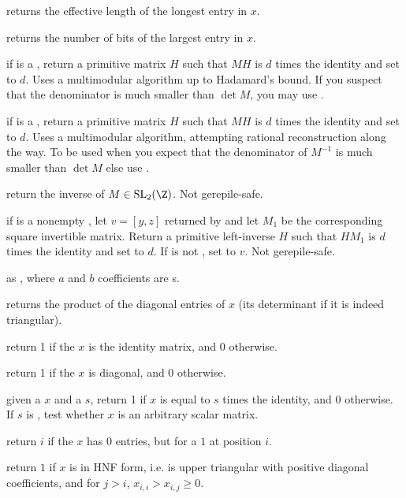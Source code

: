  returns the effective length of the longest
entry in $x$.

 returns the number of bits of the largest
entry in $x$.

 if  is a , return
a primitive matrix $H$ such that $M H$ is $d$ times the identity
and set  to $d$. Uses a multimodular algorithm up to Hadamard's bound.
If you suspect that the denominator is much smaller than $\det M$, you may
use .

 if  is a ,
return a primitive matrix $H$ such that $M H$ is $d$ times the identity
and set  to $d$. Uses a multimodular algorithm, attempting
rational reconstruction along the way. To be used when you expect that the
denominator of $M^{-1}$ is much smaller than $\det M$ else use .

 return the inverse of $M \in
\text{SL}_2(\Z)$. Not gerepile-safe.

 if  is a nonempty
, let $v = [y,z]$ returned by  and
let $M_1$ be the corresponding square invertible matrix.
Return a primitive left-inverse $H$ such that $H M_1$ is
$d$ times the identity and set  to $d$. If  is not
, set  to $v$. Not gerepile-safe.

 as , where $a$ and $b$
coefficients are s.

 returns the product of the diagonal
entries of $x$ (its determinant if it is indeed triangular).

 return 1 if the  $x$ is the
identity matrix, and 0 otherwise.

 return 1 if the  $x$ is diagonal,
and 0 otherwise.

 given a  $x$ and a
 $s$, return 1 if $x$ is equal to $s$ times the identity, and 0
otherwise. If $s$ is , test whether $x$ is an arbitrary scalar
matrix.

 return $i$ if the  $x$ has $0$ entries,
but for a $1$ at position $i$.

 return $1$ if $x$ is in HNF form, i.e. is upper
triangular with positive diagonal coefficients, and  for $j>i$,
$x_{i,i}>x_{i,j} \ge 0$.

